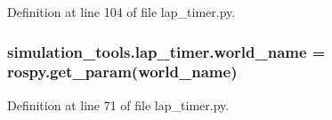 Definition at line 104 of file lap\+\_\+timer.\+py.

\subsubsection[{\texorpdfstring{world\+\_\+name}{world_name}}]{\setlength{\rightskip}{0pt plus 5cm}simulation\+\_\+tools.\+lap\+\_\+timer.\+world\+\_\+name = rospy.\+get\+\_\+param(\textquotesingle{}world\+\_\+name\textquotesingle{})}\hypertarget{namespacesimulation__tools_1_1lap__timer_ac7895961da34f237455ee1f2e19e9a33}{}\label{namespacesimulation__tools_1_1lap__timer_ac7895961da34f237455ee1f2e19e9a33}


Definition at line 71 of file lap\+\_\+timer.\+py.

